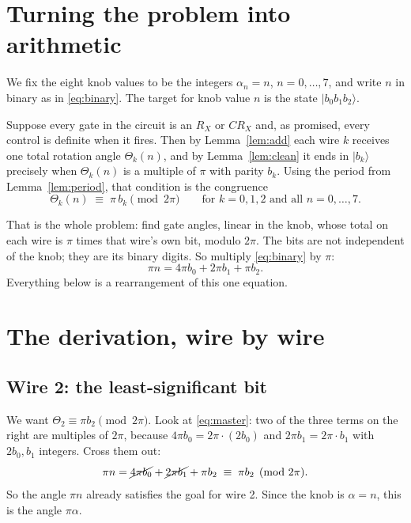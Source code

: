 \documentclass[11pt,a4paper]{article}
\newcommand{\ket}[1]{\lvert #1 \rangle}
\newcommand{\RX}{R_X}
\newcommand{\CRX}{CR_X}
\newcommand{\eqmod}[1]{\;\equiv\;#1\pmod{2\pi}}
\theoremstyle{plain}
\theoremstyle{definition}
\theoremstyle{remark}
\begin{document}
\section{Turning the problem into arithmetic}\label{sec:arith}

We fix the eight knob values to be the integers $\alpha_n = n$, $n = 0,\dots,7$, and write $n$ in
binary as in \eqref{eq:binary}. The target for knob value $n$ is the state $\ket{b_0 b_1 b_2}$.

Suppose every gate in the circuit is an $\RX$ or $\CRX$ and, as promised, every control is
definite when it fires. Then by Lemma~\ref{lem:add} each wire $k$ receives one total rotation
angle $\Theta_k(n)$, and by Lemma~\ref{lem:clean} it ends in $\ket{b_k}$ precisely when
$\Theta_k(n)$ is a multiple of $\pi$ with parity $b_k$. Using the period from
Lemma~\ref{lem:period}, that condition is the congruence
\begin{equation}\label{eq:goal}
\boxed{\;\Theta_k(n) \eqmod{\pi\, b_k}\qquad\text{for } k = 0,1,2 \text{ and all } n = 0,\dots,7.\;}
\end{equation}

That is the whole problem: find gate angles, linear in the knob, whose total on each wire is
$\pi$ times that wire's own bit, modulo $2\pi$. The bits are not independent of the knob; they
are its binary digits. So multiply \eqref{eq:binary} by $\pi$:
\begin{equation}\label{eq:master}
\pi n = 4\pi b_0 + 2\pi b_1 + \pi b_2 .
\end{equation}
Everything below is a rearrangement of this one equation.

\section{The derivation, wire by wire}\label{sec:derivation}

\subsection{Wire 2: the least-significant bit}

We want $\Theta_2 \equiv \pi b_2 \pmod{2\pi}$. Look at \eqref{eq:master}: two of the three terms
on the right are multiples of $2\pi$, because $4\pi b_0 = 2\pi\cdot(2b_0)$ and
$2\pi b_1 = 2\pi\cdot b_1$ with $2b_0, b_1$ integers. Cross them out:
\[
\pi n = \cancel{4\pi b_0} + \cancel{2\pi b_1} + \pi b_2 \eqmod{\pi b_2}.
\]
So the angle $\pi n$ already satisfies the goal for wire 2. Since the knob is $\alpha = n$, this
is the angle $\pi\alpha$.
\end{document}
